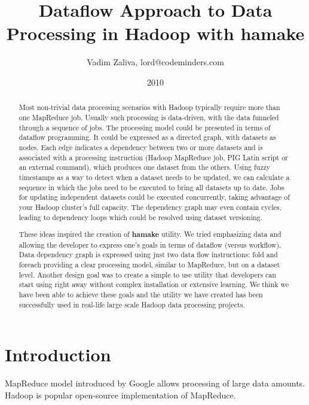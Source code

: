 \documentclass{article}
\author{Vadim Zaliva, lord@codeminders.com}
\date{2010}
\title{Dataflow Approach to Data Processing in Hadoop with \textbf{hamake}}
\begin{document}
\lstset{language=XML,basicstyle=\tiny,markfirstintag=true,numbers=left, numberstyle=\tiny}

\maketitle

\begin{abstract}
  Most non-trivial data processing scenarios with Hadoop typically
  require more than one MapReduce job. Usually such processing is
  data-driven, with the data funneled through a sequence of jobs. The
  processing model could be presented in terms of dataflow
  programming. It could be expressed as a directed graph, with
  datasets as nodes. Each edge indicates a dependency between two or
  more datasets and is associated with a processing instruction
  (Hadoop MapReduce job, PIG Latin script or an external command),
  which produces one dataset from the others. Using fuzzy timestamps
  as a way to detect when a dataset needs to be updated, we can
  calculate a sequence in which the jobs need to be executed to bring
  all datasets up to date. Jobs for updating independent datasets
  could be executed concurrently, taking advantage of your Hadoop
  cluster's full capacity. The dependency graph may even contain
  cycles, leading to dependency loops which could be resolved using
  dataset versioning.

  These ideas inspired the creation of \textbf{hamake} utility. We tried
  emphasizing data and allowing the developer to express one's goals
  in terms of dataflow (versus workflow). Data dependency graph is
  expressed using just two data flow instructions: fold and foreach
  providing a clear processing model, similar to MapReduce, but on a
  dataset level. Another design goal was to create a simple to use
  utility that developers can start using right away without complex
  installation or extensive learning. We think we have been able to
  achieve these goals and the utility we have created has been
  successfully used in real-life large scale Hadoop data processing
  projects. 
\end{abstract}

\section{Introduction}

MapReduce model introduced by Google\cite{dean2008map} allows
processing of large data amounts. Hadoop\cite{bialecki2005hadoop} is
popular open-source implementation of MapReduce.
\end{document}
